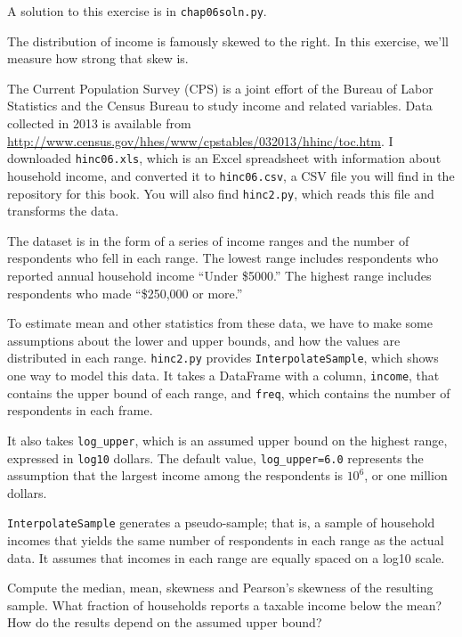 A solution to this exercise is in \verb"chap06soln.py".

\begin{exercise}

The distribution of income is famously skewed to the right.  In this
exercise, we'll measure how strong that skew is.

The Current Population Survey (CPS) is a joint effort of the Bureau
of Labor Statistics and the Census Bureau to study income and related
variables.  Data collected in 2013 is available from
\url{http://www.census.gov/hhes/www/cpstables/032013/hhinc/toc.htm}.
I downloaded {\tt hinc06.xls}, which is an Excel spreadsheet with
information about household income, and converted it to {\tt hinc06.csv},
a CSV file you will find in the repository for this book.  You
will also find {\tt hinc2.py}, which reads this file and transforms
the data.

The dataset is in the form of a series of income ranges and the number
of respondents who fell in each range.  The lowest range includes
respondents who reported annual household income ``Under \$5000.''
The highest range includes respondents who made ``\$250,000 or
more.''

To estimate mean and other statistics from these data, we have to
make some assumptions about the lower and upper bounds, and how
the values are distributed in each range.  {\tt hinc2.py} provides
{\tt InterpolateSample}, which shows one way to model
this data.  It takes a DataFrame with a column, {\tt income}, that
contains the upper bound of each range, and {\tt freq}, which contains
the number of respondents in each frame.

It also takes \verb"log_upper", which is an assumed upper bound
on the highest range, expressed in {\tt log10} dollars.  
The default value, \verb"log_upper=6.0" represents the assumption
that the largest income among the respondents is
$10^6$, or one million dollars.

{\tt InterpolateSample} generates a pseudo-sample; that is, a sample
of household incomes that yields the same number of respondents
in each range as the actual data.  It assumes that incomes in
each range are equally spaced on a log10 scale.

Compute the median, mean, skewness and Pearson's skewness of the
resulting sample.  What fraction of households reports a taxable
income below the mean?  How do the results depend on the assumed
upper bound?
\end{exercise}


